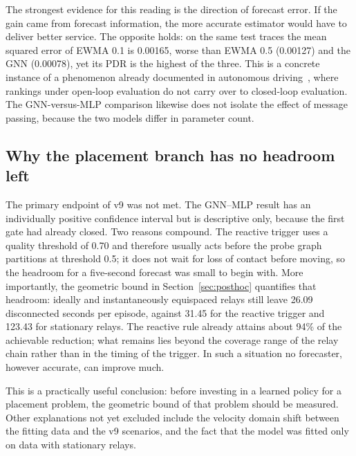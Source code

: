\documentclass[11pt,a4paper]{article}
\begin{document}
The strongest evidence for this reading is the direction of forecast error. If
the gain came from forecast information, the more accurate estimator would have
to deliver better service. The opposite holds: on the same test traces the mean
squared error of EWMA 0.1 is 0.00165, worse than EWMA 0.5 (0.00127) and the GNN
(0.00078), yet its PDR is the highest of the three. This is a concrete instance
of a phenomenon already documented in autonomous driving~\cite{closedloop2025},
where rankings under open-loop evaluation do not carry over to closed-loop
evaluation. The GNN-versus-MLP comparison likewise does not isolate the effect
of message passing, because the two models differ in parameter count.

\subsection{Why the placement branch has no headroom left}
The primary endpoint of v9 was not met. The GNN--MLP result has an individually
positive confidence interval but is descriptive only, because the first gate had
already closed. Two reasons compound. The reactive trigger uses a quality
threshold of 0.70 and therefore usually acts before the probe graph partitions
at threshold 0.5; it does not wait for loss of contact before moving, so the
headroom for a five-second forecast was small to begin with. More importantly,
the geometric bound in Section~\ref{sec:posthoc} quantifies that headroom:
ideally and instantaneously equispaced relays still leave 26.09 disconnected
seconds per episode, against 31.45 for the reactive trigger and 123.43 for
stationary relays. The reactive rule already attains about 94\% of the
achievable reduction; what remains lies beyond the coverage range of the relay
chain rather than in the timing of the trigger. In such a situation no
forecaster, however accurate, can improve much.

This is a practically useful conclusion: before investing in a learned policy
for a placement problem, the geometric bound of that problem should be measured.
Other explanations not yet excluded include the velocity domain shift between
the fitting data and the v9 scenarios, and the fact that the model was fitted
only on data with stationary relays.
\end{document}
